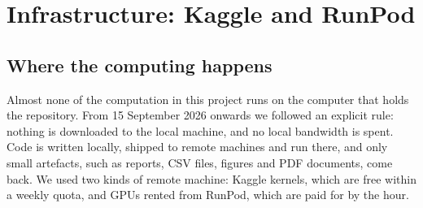 \chapter{Infrastructure: Kaggle and RunPod}\label{app:infra}

\section{Where the computing happens}\label{sec:infra-where}
Almost none of the computation in this project runs on the computer that holds the repository. From
15 September 2026 onwards we followed an explicit rule: nothing is downloaded to the local machine,
and no local bandwidth is spent. Code is written locally, shipped to remote machines and run there,
and only small artefacts, such as reports, CSV files, figures and PDF documents, come back. We used two
kinds of remote machine: Kaggle kernels, which are free within a weekly quota, and GPUs rented from
RunPod, which are paid for by the hour.

